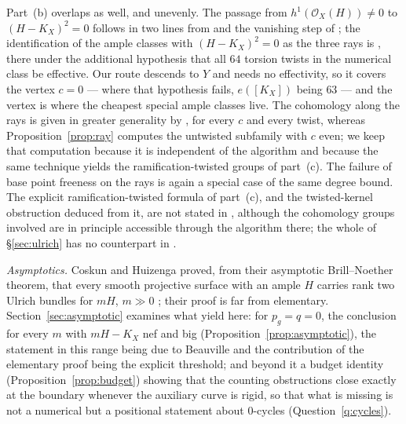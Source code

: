 \documentclass{amsart}
\theoremstyle{definition}
\newcommand{\OO}{\mathcal{O}}
\begin{document}
Part~(b) overlaps as well, and unevenly. The passage from $h^1(\OO_X(H))\neq0$ to $(H-K_X)^2=0$ follows in two lines from \cite[Prop.~4.2]{Cho26} and the vanishing step of \cite[Algorithm~4.18(3.1)]{Cho26}; the identification of the ample classes with $(H-K_X)^2=0$ as the three rays is \cite[Prop.~4.10]{Cho26}, there under the additional hypothesis that all $64$ torsion twists in the numerical class be effective. Our route descends to $Y$ and needs no effectivity, so it covers the vertex $c=0$ --- where that hypothesis fails, $e([K_X])$ being $63$ --- and the vertex is where the cheapest special ample classes live. The cohomology along the rays is given in greater generality by \cite[Prop.~4.27]{Cho26}, for every $c$ and every twist, whereas Proposition~\ref{prop:ray} computes the untwisted subfamily with $c$ even; we keep that computation because it is independent of the algorithm and because the same technique yields the ramification-twisted groups of part~(c). The failure of base point freeness on the rays is again a special case of the same degree bound. The explicit ramification-twisted formula of part~(c), and the twisted-kernel obstruction deduced from it, are not stated in \cite{Cho26}, although the cohomology groups involved are in principle accessible through the algorithm there; the whole of \S\ref{sec:ulrich} has no counterpart in \cite{Cho26}.

\smallskip
\noindent\emph{Asymptotics.} Coskun and Huizenga proved, from their asymptotic Brill--Noether theorem, that every smooth projective surface with an ample $H$ carries rank two Ulrich bundles for $mH$, $m\gg0$ \cite[Thm.~1.2]{CH20}; their proof is far from elementary. Section~\ref{sec:asymptotic} examines what \cite{LQ94,An94} yield here: for $p_g=q=0$, the conclusion for every $m$ with $mH-K_X$ nef and big (Proposition~\ref{prop:asymptotic}), the statement in this range being due to Beauville \cite{Bea16b} and the contribution of the elementary proof being the explicit threshold; and beyond it a budget identity (Proposition~\ref{prop:budget}) showing that the counting obstructions close exactly at the boundary whenever the auxiliary curve is rigid, so that what is missing is not a numerical but a positional statement about $0$-cycles (Question~\ref{q:cycles}).
\end{document}
